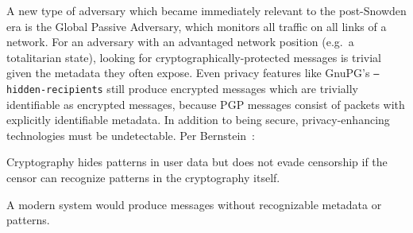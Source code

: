 A new type of adversary which became immediately relevant to the post-Snowden era is the Global Passive Adversary, which
monitors all traffic on all links of a network.
For an adversary with an advantaged network position (e.g.\ a totalitarian state), looking for
cryptographically-protected messages is trivial given the metadata they often expose.
Even privacy features like GnuPG's \texttt{--hidden-recipients} still produce encrypted messages which are trivially
identifiable as encrypted messages, because PGP messages consist of packets with explicitly identifiable metadata.
In addition to being secure, privacy-enhancing technologies must be undetectable.
Per Bernstein~\cite{bernstein2013}:

\begin{displayquote}
    Cryptography hides patterns in user data but does not evade censorship if the censor can recognize patterns in the
    cryptography itself.
\end{displayquote}

A modern system would produce messages without recognizable metadata or patterns.
